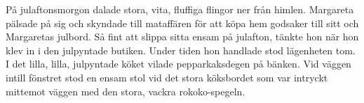 På julaftonsmorgon dalade stora, vita, fluffiga flingor ner från himlen. Margareta pälsade på sig och skyndade till mataffären för att köpa hem godsaker till sitt och Margaretas julbord. Så fint att slippa sitta ensam på julafton, tänkte hon när hon klev in i den julpyntade butiken. Under tiden hon handlade stod lägenheten tom. I det lilla, lilla, julpyntade köket vilade pepparkaksdegen på bänken. Vid väggen intill fönstret stod en ensam stol vid det stora köksbordet som var intryckt mittemot väggen med den stora, vackra rokoko-spegeln. 
